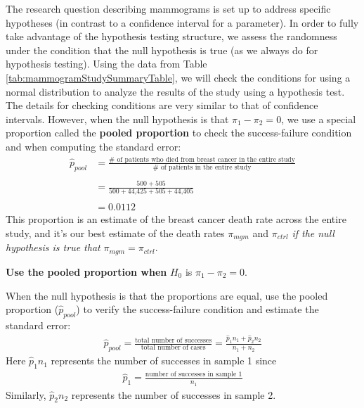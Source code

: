 \documentclass[
  10pt,
  openany]{book}
\theoremstyle{definition}
\theoremstyle{definition}
\theoremstyle{definition}
\theoremstyle{definition}
\theoremstyle{remark}
\begin{document}
The research question describing mammograms is set up to address specific hypotheses (in contrast to a confidence interval for a parameter). In order to fully take advantage of the hypothesis testing structure, we assess the randomness under the condition that the null hypothesis is true (as we always do for hypothesis testing). Using the data from Table \ref{tab:mammogramStudySummaryTable}, we will check the conditions for using a normal distribution to analyze the results of the study using a hypothesis test. The details for checking conditions are very similar to that of confidence intervals. However, when the null hypothesis is that \(\pi_1 - \pi_2 = 0\), we use a special proportion called the \textbf{pooled proportion} to check the success-failure condition and when computing the standard error: \begin{align*}
\hat{p}_{\textit{pool}}
    &= \frac
        {\text{# of patients who died from breast cancer in the entire study}}
        {\text{# of patients in the entire study}} \\
        &\\
    &= \frac{500 + 505}{500 + \text{44,425} + 505 + \text{44,405}} \\
    &\\
    &= 0.0112
\end{align*} This proportion is an estimate of the breast cancer death rate across the entire study, and it's our best estimate of the death rates \(\pi_{mgm}\) and \(\pi_{ctrl}\) \emph{if the null hypothesis is true that} \(\pi_{mgm} = \pi_{ctrl}\).

\textbf{Use the pooled proportion when} \(H_0\) is \(\pi_1 - \pi_2 = 0\).

When the null hypothesis is that the proportions are equal, use the pooled proportion (\(\hat{p}_{\textit{pool}}\)) to verify the success-failure condition and estimate the standard error: \begin{eqnarray*}
  \hat{p}_{\textit{pool}}
    = \frac{\text{total number of successes}}
      {\text{total number of cases}}
    = \frac{\hat{p}_1 n_1 + \hat{p}_2 n_2}{n_1 + n_2}
  \end{eqnarray*} Here \(\hat{p}_1 n_1\) represents the number of successes in sample 1 since \begin{eqnarray*}
  \hat{p}_1
    = \frac{\text{number of successes in sample 1}}{n_1}
  \end{eqnarray*} Similarly, \(\hat{p}_2 n_2\) represents the number of successes in sample 2.
\end{document}
